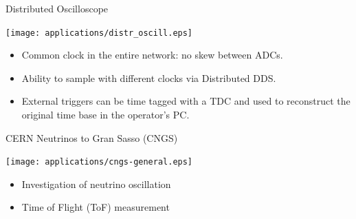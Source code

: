\documentclass[compress,red]{beamer}
\begin{document}
\begin{frame}{Distributed Oscilloscope}
  \begin{center}
    \texttt{[image: applications/distr\_oscill.eps]}
    \end{center}
    \begin{block}{}
      \begin{itemize}
      \item Common clock in the entire network: no skew between ADCs.
      \item Ability to sample with different clocks via Distributed DDS.
      \item External triggers can be time tagged with a TDC and used to reconstruct the original time base in the operator's PC.
      \end{itemize}
    \end{block}
\end{frame}
\begin{frame}{CERN Neutrinos to Gran Sasso (CNGS)}

    \begin{center}
      \texttt{[image: applications/cngs-general.eps]}
    \end{center}

    \begin{center}
      \begin{itemize}
	\item Investigation of neutrino oscillation
	\item Time of Flight (ToF) measurement
      \end{itemize}

    \end{center}

\end{frame}
\end{document}
